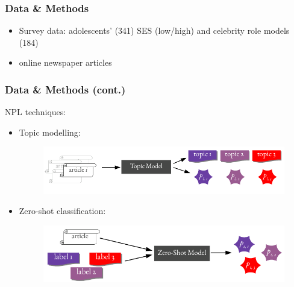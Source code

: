 \begin{frame}
	\frametitle{Data \& Methods}
	\begin{itemize}
		\item<+-> Survey data: adolescents' (341) SES (low/high) and celebrity role models (184)
		\item<+-> online newspaper articles
	\end{itemize}
\end{frame}
\begin{frame}
	\frametitle{Data \& Methods (cont.)}
	NPL techniques:
	\begin{itemize}
		\item <+-> Topic modelling:
		\begin{figure}
			\centering
			\includegraphics[scale=1]{img/topic_modelling_schema_simple.pdf}
		\end{figure}
		\item <+-> Zero-shot classification:
		\begin{figure}
			\centering
			\includegraphics[scale=1]{img/zero_shot_schema_simple.pdf}
		\end{figure}
	\end{itemize}
\end{frame}



